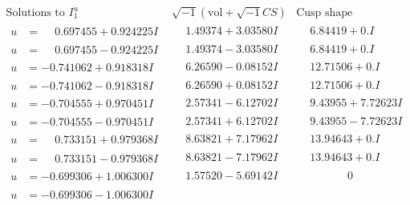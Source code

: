 \documentclass[1p]{elsarticle_modified}
\theoremstyle{definition}
\newcommand{\I}{\sqrt{-1}}
\begin{document}
$$\begin{array}{c|c|c}
\text{Solutions to }I^u_{1}& \I (\text{vol} + \sqrt{-1}CS) & \text{Cusp shape}\\
 \hline 
\begin{aligned}
u &= \phantom{-}0.697455 + 0.924225 I\end{aligned}
 & \phantom{-}1.49374 + 3.03580 I & \phantom{-}6.84419 + 0. I\phantom{ +0.000000I} \\ \hline\begin{aligned}
u &= \phantom{-}0.697455 - 0.924225 I\end{aligned}
 & \phantom{-}1.49374 - 3.03580 I & \phantom{-}6.84419 + 0. I\phantom{ +0.000000I} \\ \hline\begin{aligned}
u &= -0.741062 + 0.918318 I\end{aligned}
 & \phantom{-}6.26590 - 0.08152 I & \phantom{-}12.71506 + 0. I\phantom{ +0.000000I} \\ \hline\begin{aligned}
u &= -0.741062 - 0.918318 I\end{aligned}
 & \phantom{-}6.26590 + 0.08152 I & \phantom{-}12.71506 + 0. I\phantom{ +0.000000I} \\ \hline\begin{aligned}
u &= -0.704555 + 0.970451 I\end{aligned}
 & \phantom{-}2.57341 - 6.12702 I & \phantom{-}9.43955 + 7.72623 I \\ \hline\begin{aligned}
u &= -0.704555 - 0.970451 I\end{aligned}
 & \phantom{-}2.57341 + 6.12702 I & \phantom{-}9.43955 - 7.72623 I \\ \hline\begin{aligned}
u &= \phantom{-}0.733151 + 0.979368 I\end{aligned}
 & \phantom{-}8.63821 + 7.17962 I & \phantom{-}13.94643 + 0. I\phantom{ +0.000000I} \\ \hline\begin{aligned}
u &= \phantom{-}0.733151 - 0.979368 I\end{aligned}
 & \phantom{-}8.63821 - 7.17962 I & \phantom{-}13.94643 + 0. I\phantom{ +0.000000I} \\ \hline\begin{aligned}
u &= -0.699306 + 1.006300 I\end{aligned}
 & \phantom{-}1.57520 - 5.69142 I & \phantom{-0.000000 } 0 \\ \hline\begin{aligned}
u &= -0.699306 - 1.006300 I\end{aligned}

\end{array}$$
\end{document}
